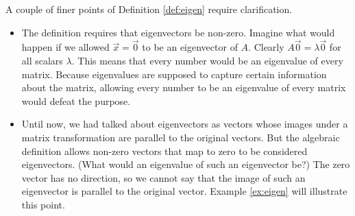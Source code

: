\documentclass{ximera}
\begin{document}
\begin{observation}\label{obs:finerPointsOfEigDef}
A couple of finer points of Definition \ref{def:eigen} require clarification.
  \begin{itemize}
  \item The definition requires that eigenvectors be non-zero.  Imagine what would happen if we allowed $\vec{x}=\vec{0}$ to be an eigenvector of $A$. Clearly $A\vec{0}=\lambda\vec{0}$ for all scalars $\lambda$.  This means that every number would be an eigenvalue of every matrix.  Because eigenvalues are supposed to capture certain information about the matrix, allowing every number to be an eigenvalue of every matrix would defeat the purpose.
  \item Until now, we had talked about  eigenvectors as vectors whose images under a matrix transformation are parallel to the original vectors.  But the algebraic definition allows non-zero vectors that map to zero to be considered eigenvectors.  (What would an eigenvalue of such an eigenvector be?)  The zero vector has no direction, so we cannot say that the image of such an eigenvector is parallel to the original vector.  Example \ref{ex:eigen} will illustrate this point.
  \end{itemize}
\end{observation}
\end{document}
